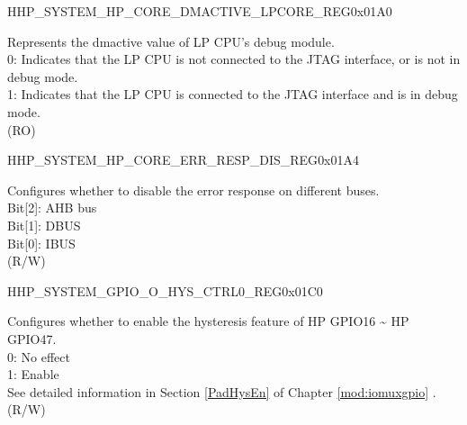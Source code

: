 \begin{register}{H}{HP\_SYSTEM\_HP\_CORE\_DMACTIVE\_LPCORE\_REG}{0x01A0}\label{regdesc:HPSYSTEMHPCOREDMACTIVELPCOREREG}
%
%
\regnewline%
\begin{regdesc}\begin{reglist}
\label{fielddesc:HPSYSTEMCOREDMACTIVELPCORE}\item [HP\_SYSTEM\_CORE\_DMACTIVE\_LPCORE] Represents the dmactive value of LP CPU's debug module.\\
0: Indicates that the LP CPU is not connected to the JTAG interface, or is not in debug mode.\\
1: Indicates that the LP CPU is connected to the JTAG interface and is in debug mode.\\
(RO)
\end{reglist}\end{regdesc}
\end{register}


\begin{register}{H}{HP\_SYSTEM\_HP\_CORE\_ERR\_RESP\_DIS\_REG}{0x01A4}\label{regdesc:HPSYSTEMHPCOREERRRESPDISREG}
%
%
\regnewline%
\begin{regdesc}\begin{reglist}
\label{fielddesc:HPSYSTEMCOREERRRESPDIS}\item [HP\_SYSTEM\_CORE\_ERR\_RESP\_DIS] Configures whether to disable the error response on different buses.\\
Bit[2]: AHB bus\\
Bit[1]: DBUS\\
Bit[0]: IBUS\\
(R/W)
\end{reglist}\end{regdesc}
\end{register}


\begin{register}{H}{HP\_SYSTEM\_GPIO\_O\_HYS\_CTRL0\_REG}{0x01C0}\label{regdesc:HPSYSTEMGPIOOHYSCTRL0REG}
%
\regnewline%
\begin{regdesc}\begin{reglist}
\label{fielddesc:HPSYSTEMGPIO0HYSLOW}\item [HP\_SYSTEM\_GPIO\_0\_HYS\_LOW] Configures whether to enable the hysteresis feature of HP GPIO16 \textasciitilde{} HP GPIO47. \\
0: No effect\\
1: Enable\\
See detailed information in Section \ref{PadHysEn} of Chapter \ref{mod:iomuxgpio} \textit{}.\\
(R/W)
\end{reglist}\end{regdesc}
\end{register}



